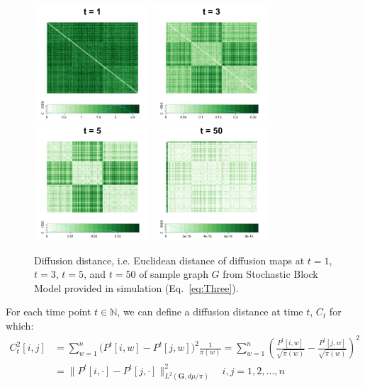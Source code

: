 \documentclass[12pt]{article}
\theoremstyle{definition}
\begin{document}
\begin{figure}[H]
	\centering
	\includegraphics[width=1.7in]{../Figure/Dx1.png}
	\includegraphics[width=1.7in]{../Figure/Dx3.png}
	\includegraphics[width=1.7in]{../Figure/Dx5.png}
	\includegraphics[width=1.7in]{../Figure/Dx50.png}
	\caption{Diffusion distance, i.e. Euclidean distance of diffusion maps at $t=1$, $t=3$, $t=5$, and $t=50$ of sample graph $G$ from Stochastic Block Model provided in simulation (Eq.~\ref{eq:Three}).}
	\label{fig:diffusions}
\end{figure}	
For each time point $t \in \mathbb{N}$, we can define a diffusion distance at time $t$, $C_{t}$ for which:	
\begin{equation}
\label{eq:diffusion}
\begin{split}
C^2_{t}[i,j] & = \sum\limits_{w =1}^{n} \big( P^{t}[i,w] - P^{t}[j,w]  \big)^{2} \frac{1}{\pi(w)} = \sum\limits_{w=1}^{n} \left(  \frac{P^{t}[i,w]}{\sqrt{\pi(w)}} - \frac{P^{t}[j,w]}{\sqrt{\pi(w)}}   \right)^2 \\ & = \parallel P^{t}[i, \cdot] - P^{t}[j, \cdot]  \parallel^2_{L^{2}(\boldsymbol{G}, d\mu / \pi)  } \quad i,j = 1,2, \ldots , n
\end{split}
\end{equation}
\end{document}
